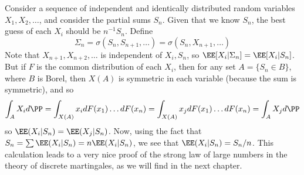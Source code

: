 \begin{example}
    Consider a sequence of independent and identically distributed random variables $X_1, X_2, \dots$, and consider the partial sums $S_n$. Given that we know $S_n$, the best guess of each $X_i$ should be $n^{-1} S_n$. Define
    \[ \Sigma_n = \sigma(S_n, S_{n+1}, \dots) = \sigma(S_n, X_{n+1}, \dots) \]
    Note that $X_{n+1}, X_{n+2}, \dots$ is independent of $X_i, S_n$, so $\EE[X_i|\Sigma_n] = \EE[X_i|S_n]$. But if $F$ is the common distribution of each $X_i$, then for any set $A = \{ S_n \in B \}$, where $B$ is Borel, then $X(A)$ is symmetric in each variable (because the sum is symmetric), and so
    \[ \int_A X_i d\PP = \int_{X(A)} x_i dF(x_1) \dots dF(x_n) = \int_{X(A)} x_j dF(x_1) \dots dF(x_n) = \int_A X_j d\PP \]
    so $\EE(X_i|S_n) = \EE(X_j|S_n)$. Now, using the fact that $S_n = \sum \EE(X_i|S_n) = n\EE(X_i|S_n)$, we see that $\EE(X_i|S_n) = S_n/n$. This calculation leads to a very nice proof of the strong law of large numbers in the theory of discrete martingales, as we will find in the next chapter.
\end{example}





